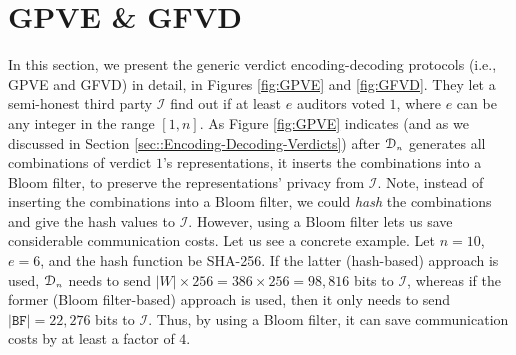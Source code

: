 
\vspace{-3mm}

\section{GPVE \& GFVD}\label{sec::Generic-Verdict-Encoding-Decoding-Protocols}
\vspace{-1mm}
In this section, we present the  generic verdict encoding-decoding protocols (i.e., GPVE and GFVD) in detail, in Figures \ref{fig:GPVE} and \ref{fig:GFVD}. They  let a semi-honest third party $\mathcal{I}$ find out if at least $e$ auditors voted $1$, where $e$ can be any integer in the range $[1, n]$.  
%
As    Figure \ref{fig:GPVE} indicates (and as we discussed in Section \ref{sec::Encoding-Decoding-Verdicts}) after $\mathcal{D}_{\scriptscriptstyle n}$ generates all combinations of verdict $1$'s  representations, it inserts the combinations into a Bloom filter, to preserve the representations' privacy from $\mathcal{I}$. Note, instead of inserting the combinations into a Bloom filter, we could  \emph{hash}  the combinations and give the hash values to $\mathcal{I}$. However, using a Bloom filter lets us save considerable communication costs. Let us see a concrete example. Let $n=10$, $e=6$, and the hash function be SHA-256.  If the latter (hash-based) approach is used,  $\mathcal{D}_{\scriptscriptstyle n}$ needs to send  $|W|\times 256= 386\times 256=98,816$ bits to $\mathcal{I}$, whereas  if the former (Bloom filter-based) approach is used, then it only needs to send $|\mathtt{BF}|=22,276 $ bits to $\mathcal{I}$. Thus, by using a Bloom filter,  it can save communication costs by at least a factor of  $4$.  

\vspace{-2mm}


